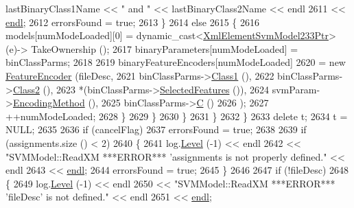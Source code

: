 \begin{DoxyCode}
      lastBinaryClass1Name << \textcolor{stringliteral}{" and "} << lastBinaryClass2Name << endl
2611               << \hyperlink{namespace_k_k_b_ad1f50f65af6adc8fa9e6f62d007818a8}{endl};
2612             errorsFound = \textcolor{keyword}{true};
2613           \}
2614           \textcolor{keywordflow}{else}
2615           \{
2616             models[numModeLoaded][0] = \textcolor{keyword}{dynamic\_cast<}\hyperlink{class_k_k_b_1_1_xml_element_template}{XmlElementSvmModel233Ptr}\textcolor{keyword}{>} (e)->
      TakeOwnership ();
2617             binaryParameters[numModeLoaded] = binClassParms;
2618 
2619             binaryFeatureEncoders[numModeLoaded] 
2620                 = \textcolor{keyword}{new} \hyperlink{class_k_k_m_l_l_1_1_feature_encoder}{FeatureEncoder} (fileDesc,
2621                                       binClassParms->\hyperlink{class_k_k_m_l_l_1_1_binary_class_parms_aa8519ac2f7f7e4553143e12786209415}{Class1} (),
2622                                       binClassParms->\hyperlink{class_k_k_m_l_l_1_1_binary_class_parms_a38ea0c5dd0416d6aef402befeaf7a220}{Class2} (),
2623                                       *(binClassParms->\hyperlink{class_k_k_m_l_l_1_1_binary_class_parms_a2885a141b7eb3f3230e9c164265adcab}{SelectedFeatures} ()),
2624                                       svmParam->\hyperlink{class_k_k_m_l_l_1_1_s_v_mparam_a64c242e8dc965631a3f3a95de555cd40}{EncodingMethod} (),
2625                                       binClassParms->\hyperlink{class_k_k_m_l_l_1_1_binary_class_parms_aefb6c5d54ce92e8c8ce96f6b9f2eafc2}{C} ()
2626                                      );
2627             ++numModeLoaded;
2628           \}
2629         \}
2630       \}
2631     \}
2632   \}
2633   \textcolor{keyword}{delete}  t;
2634   t = NULL;
2635 
2636   \textcolor{keywordflow}{if}  (cancelFlag)
2637     errorsFound = \textcolor{keyword}{true};
2638 
2639   \textcolor{keywordflow}{if}  (assignments.size () < 2)
2640   \{
2641    log.\hyperlink{class_k_k_b_1_1_run_log_a32cf761d7f2e747465fd80533fdbb659}{Level} (-1) << endl 
2642      << \textcolor{stringliteral}{"SVMModel::ReadXM   ***ERROR***   'assignments is not properly defined."} << endl
2643      << \hyperlink{namespace_k_k_b_ad1f50f65af6adc8fa9e6f62d007818a8}{endl};
2644     errorsFound = \textcolor{keyword}{true};
2645   \}
2646 
2647   \textcolor{keywordflow}{if}  (!fileDesc)
2648   \{
2649    log.\hyperlink{class_k_k_b_1_1_run_log_a32cf761d7f2e747465fd80533fdbb659}{Level} (-1) << endl 
2650      << \textcolor{stringliteral}{"SVMModel::ReadXM   ***ERROR***   'fileDesc' is not defined."} << endl
2651      << \hyperlink{namespace_k_k_b_ad1f50f65af6adc8fa9e6f62d007818a8}{endl};

\end{DoxyCode}
